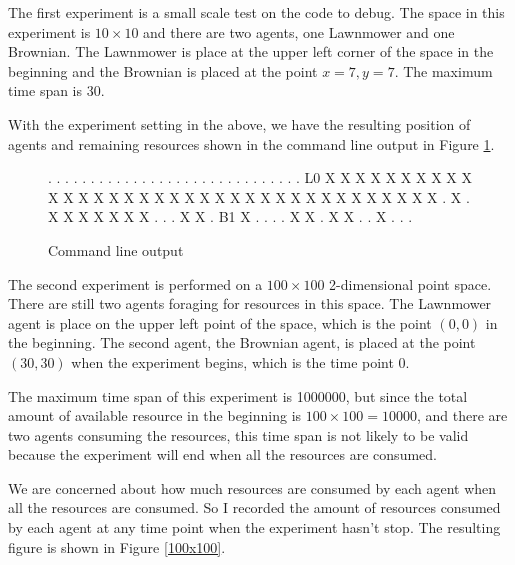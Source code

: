 \documentclass[a4paper, 12pt]{report}
\begin{document}
The first experiment is a small scale test on the code to debug. The space in this experiment is $10\times 10$ and there are two agents, one Lawnmower and one Brownian. The Lawnmower is place at the upper left corner of the space in the beginning and the Brownian is placed at the point $x=7, y=7$. The maximum time span is 30. 

With the experiment setting in the above, we have the resulting position of agents and remaining resources shown in the command line output in Figure \ref{cmd}.
\begin{figure}[htp]
    \centering
    \begin{messageshell}
.        .       .       .       .       .       .       .       .       .
.        .       .       .       .       .       .       .       .       .
.        .       .       .       .       .       .       .       .       .
L0       X       X       X       X       X       X       X       X       X
X        X       X       X       X       X       X       X       X       X
X        X       X       X       X       X       X       X       X       X
X        X       X       X       X       X       X       .       X       .
X        X       X       X       X       X       X       .       .       .
X        X       .       B1      X       .       .       .       .       X
X        .       X       X       .       .       X       .       .       .
    \end{messageshell}
    \caption{Command line output}
    \label{cmd}
\end{figure}

The second experiment is performed on a $100\times100$ 2-dimensional point space. There are still two agents foraging for resources in this space. The Lawnmower agent is place on the upper left point of the space, which is the point $(0,0)$ in the beginning. The second agent, the Brownian agent, is placed at the point $(30,30)$ when the experiment begins, which is the time point 0.

The maximum time span of this experiment is 1000000, but since the total amount of available resource in the beginning is $100\times 100=10000$, and there are two agents consuming the resources, this time span is not likely to be valid because the experiment will end when all the resources are consumed.

We are concerned about how much resources are consumed by each agent when all the resources are consumed. So I recorded the amount of resources consumed by each agent at any time point when the experiment hasn't stop. The resulting figure is shown in Figure \ref{100x100}.
\end{document}
